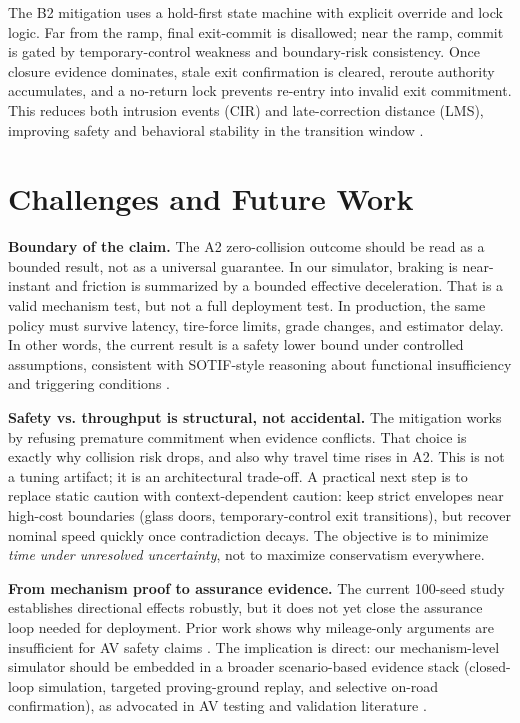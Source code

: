 \documentclass[sigconf,nonacm]{acmart}
\begin{document}
The B2 mitigation uses a hold-first state machine with explicit override and lock logic. Far from the ramp, final exit-commit is disallowed; near the ramp, commit is gated by temporary-control weakness and boundary-risk consistency. Once closure evidence dominates, stale exit confirmation is cleared, reroute authority accumulates, and a no-return lock prevents re-entry into invalid exit commitment. This reduces both intrusion events (CIR) and late-correction distance (LMS), improving safety and behavioral stability in the transition window \cite{veer2022,shalev2017}.

\section{Challenges and Future Work}

\textbf{Boundary of the claim.}
The A2 zero-collision outcome should be read as a bounded result, not as a universal guarantee. In our simulator, braking is near-instant and friction is summarized by a bounded effective deceleration. That is a valid mechanism test, but not a full deployment test. In production, the same policy must survive latency, tire-force limits, grade changes, and estimator delay. In other words, the current result is a safety lower bound under controlled assumptions, consistent with SOTIF-style reasoning about functional insufficiency and triggering conditions \cite{iso21448}.

\textbf{Safety vs. throughput is structural, not accidental.}
The mitigation works by refusing premature commitment when evidence conflicts. That choice is exactly why collision risk drops, and also why travel time rises in A2. This is not a tuning artifact; it is an architectural trade-off. A practical next step is to replace static caution with context-dependent caution: keep strict envelopes near high-cost boundaries (glass doors, temporary-control exit transitions), but recover nominal speed quickly once contradiction decays. The objective is to minimize \emph{time under unresolved uncertainty}, not to maximize conservatism everywhere.

\textbf{From mechanism proof to assurance evidence.}
The current 100-seed study establishes directional effects robustly, but it does not yet close the assurance loop needed for deployment. Prior work shows why mileage-only arguments are insufficient for AV safety claims \cite{kalra2016}. The implication is direct: our mechanism-level simulator should be embedded in a broader scenario-based evidence stack (closed-loop simulation, targeted proving-ground replay, and selective on-road confirmation), as advocated in AV testing and validation literature \cite{koopman2016sae,koopman2017its}.
\end{document}
